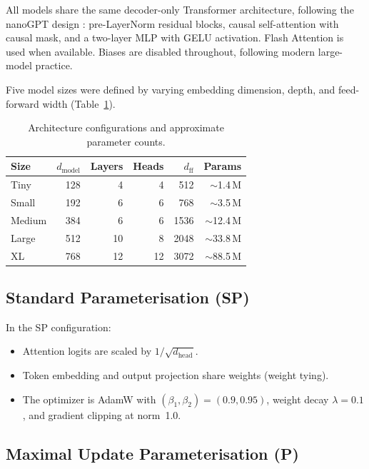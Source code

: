 \documentclass[11pt,a4paper]{article}
\begin{document}
All models share the same decoder-only Transformer architecture, following the nanoGPT
design \citep{karpathy2022nanogpt}: pre-LayerNorm residual blocks, causal self-attention
with causal mask, and a two-layer MLP with GELU activation.  Flash Attention
\citep{dao2022flashattention} is used when available.  Biases are disabled throughout,
following modern large-model practice.

Five model sizes were defined by varying embedding dimension, depth, and feed-forward
width (Table~\ref{tab:sizes}).

\begin{table}[H]
\centering
\caption{Architecture configurations and approximate parameter counts.}
\label{tab:sizes}
\begin{tabular}{lrrrrr}
\toprule
\textbf{Size} & \textbf{$d_\text{model}$} & \textbf{Layers} & \textbf{Heads} &
  \textbf{$d_\text{ff}$} & \textbf{Params} \\
\midrule
Tiny   & 128  & 4  & 4  & 512   & $\sim$1.4\,M  \\
Small  & 192  & 6  & 6  & 768   & $\sim$3.5\,M  \\
Medium & 384  & 6  & 6  & 1536  & $\sim$12.4\,M \\
Large  & 512  & 10 & 8  & 2048  & $\sim$33.8\,M \\
XL     & 768  & 12 & 12 & 3072  & $\sim$88.5\,M \\
\bottomrule
\end{tabular}
\end{table}

\subsection{Standard Parameterisation (SP)}

In the SP configuration:
\begin{itemize}
  \item Attention logits are scaled by $1/\sqrt{d_\text{head}}$.
  \item Token embedding and output projection share weights (weight tying).
  \item The optimizer is AdamW with $(\beta_1, \beta_2) = (0.9, 0.95)$, weight
        decay $\lambda = 0.1$, and gradient clipping at norm~1.0.
\end{itemize}

\subsection{Maximal Update Parameterisation (\textmu P)}
\end{document}
